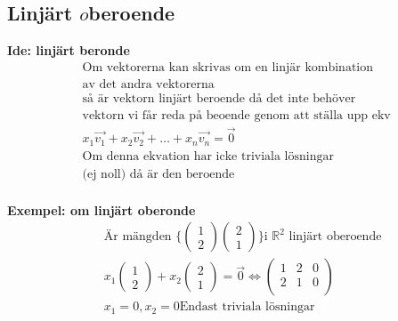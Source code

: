 \begin{multicols}{2}
\section{Linjärt \(o\)beroende}
\textbf{Ide: linjärt beronde}
\begin{align*}
  &\text{Om vektorerna kan skrivas om en linjär kombination} \\
  &\text{av det andra vektorerna} \\
  &\text{så är vektorn linjärt beroende då det inte behöver} \\
  &\text{vektorn vi får reda på beoende genom att ställa upp ekv} \\
  &x_1\vec{v_1}+x_2\vec{v_2} + \ldots{} + x_n\vec{v_n} = \vec{0} \\
  &\text{Om denna ekvation har icke triviala lösningar} \\
  &\text{(ej noll) då är den beroende} \\
\end{align*}


\textbf{Exempel: om linjärt oberonde}
\begin{align*}
  &\quad  \text{Är mängden }  \Big\{
  \begin{pmatrix} 1 \\ 2  \end{pmatrix}
  \begin{pmatrix} 2 \\ 1  \end{pmatrix} \Big\}
  \text{i $\mathbb{R}^2$ linjärt oberoende}  \\
  &\quad
  x_1\begin{pmatrix} 1 \\ 2  \end{pmatrix} +
  x_2\begin{pmatrix} 2 \\ 1  \end{pmatrix} = \vec{0} 
  \Leftrightarrow
  \left(\begin{array}{cc|c}
    1   & 2  & 0  \\
    2   & 1  & 0  \\
  \end{array}\right) \\
  &\quad  x_1=0, x_2=0 \text{Endast triviala lösningar } \\
\end{align*}




\end{multicols}
